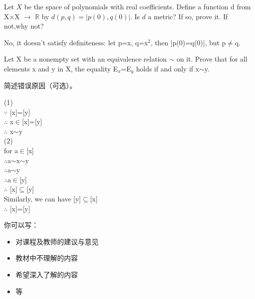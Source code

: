 \documentclass[11pt, a4paper, UTF8]{ctexart}
\begin{document}
\begin{problem}[UD:23.10]
Let $X$ be the space of polynomials with real coefficients. Define a function d from X$\times$X $\rightarrow$ $\mathbb{R}$ by $d(p,q)=|p(0),q(0)|.$ Is $d$ a metric? If so, prove it. If not,why not?
\end{problem}
\begin{solution}
No, it doesn't satisfy definiteness: let p=x, q=x$^2$, then |p(0)=q(0)|, but p$\not=$q.
\end{solution}




\begincorrection	%

\begin{problem}[UD: 10.5]
  Let X be a nonempty set with an equivalence relation $\sim$ on it. Prove that for all elements x and y in X, the equality E$_x$=E$_y$ holds if and only if x$\sim$y.
\end{problem}

\begin{cause}
  简述错误原因（可选）。
\end{cause}

\begin{revision}
  (1)\\
  $\because$ [x]=[y]\\
  $\therefore$ x$\in$[x]=[y]\\
  $\therefore$ x$\sim$y\\
  (2)\\
  for a$\in$[x]\\
  $\therefore$a$\sim$x$\sim$y\\
  $\therefore$a$\sim$y\\
  $\therefore$a$\in$[y]\\
  $\therefore$ [x]$\subseteq$[y]\\
  Similarly, we can have [y]$\subseteq$[x]\\
  $\therefore$ [x]=[y]
\end{revision}
\beginfb	%

你可以写：
\begin{itemize}
  \item 对课程及教师的建议与意见
  \item 教材中不理解的内容
  \item 希望深入了解的内容
  \item 等
\end{itemize}
\end{document}
